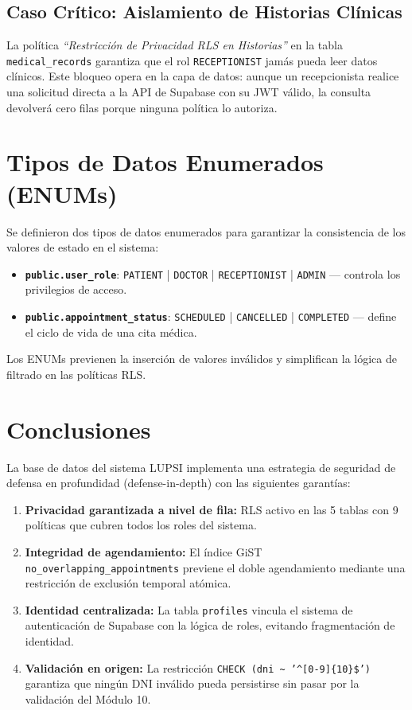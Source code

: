 \documentclass[a4paper,12pt]{article}
\begin{document}
\subsection{Caso Crítico: Aislamiento de Historias Clínicas}
La política \textit{``Restricción de Privacidad RLS en Historias''} en la tabla \texttt{medical\_records} garantiza que el rol \texttt{RECEPTIONIST} jamás pueda leer datos clínicos. Este bloqueo opera en la capa de datos: aunque un recepcionista realice una solicitud directa a la API de Supabase con su JWT válido, la consulta devolverá cero filas porque ninguna política lo autoriza.

\section{Tipos de Datos Enumerados (ENUMs)}
Se definieron dos tipos de datos enumerados para garantizar la consistencia de los valores de estado en el sistema:

\begin{itemize}
  \item \textbf{\texttt{public.user\_role}}: \texttt{PATIENT} | \texttt{DOCTOR} | \texttt{RECEPTIONIST} | \texttt{ADMIN} — controla los privilegios de acceso.
  \item \textbf{\texttt{public.appointment\_status}}: \texttt{SCHEDULED} | \texttt{CANCELLED} | \texttt{COMPLETED} — define el ciclo de vida de una cita médica.
\end{itemize}

Los ENUMs previenen la inserción de valores inválidos y simplifican la lógica de filtrado en las políticas RLS.

\section{Conclusiones}
La base de datos del sistema LUPSI implementa una estrategia de seguridad de defensa en profundidad (defense-in-depth) con las siguientes garantías:

\begin{enumerate}
  \item \textbf{Privacidad garantizada a nivel de fila:} RLS activo en las 5 tablas con 9 políticas que cubren todos los roles del sistema.
  \item \textbf{Integridad de agendamiento:} El índice GiST \texttt{no\_overlapping\_appointments} previene el doble agendamiento mediante una restricción de exclusión temporal atómica.
  \item \textbf{Identidad centralizada:} La tabla \texttt{profiles} vincula el sistema de autenticación de Supabase con la lógica de roles, evitando fragmentación de identidad.
  \item \textbf{Validación en origen:} La restricción \texttt{CHECK (dni \textasciitilde{} '\^{}[0-9]\{10\}\$')} garantiza que ningún DNI inválido pueda persistirse sin pasar por la validación del Módulo 10.
\end{enumerate}
\end{document}
